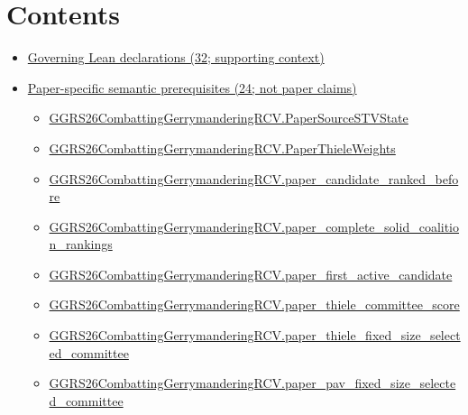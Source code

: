 \documentclass[10pt]{article}
\begin{document}
\section*{Contents}
\begin{itemize}[leftmargin=1.2em]
\item \hyperlink{governing-declaration-section-5ef5ef0364b6939c}{Governing Lean declarations (32; supporting context)}
\item \hyperlink{paper-prerequisite-section-5ef5ef0364b6939c}{Paper-specific semantic prerequisites (24; not paper claims)}
\begin{itemize}[leftmargin=1.2em]
\item \hyperlink{paper-prerequisite-9acd2440ce1052db}{GGRS26\allowbreak{}Combatting\allowbreak{}Gerrymandering\allowbreak{}RCV.\allowbreak{}Paper\allowbreak{}Source\allowbreak{}STV\allowbreak{}State}
\item \hyperlink{paper-prerequisite-37b91baa3b4ddc9d}{GGRS26\allowbreak{}Combatting\allowbreak{}Gerrymandering\allowbreak{}RCV.\allowbreak{}Paper\allowbreak{}Thiele\allowbreak{}Weights}
\item \hyperlink{paper-prerequisite-b12522706ad3f624}{GGRS26\allowbreak{}Combatting\allowbreak{}Gerrymandering\allowbreak{}RCV.\allowbreak{}paper\_\allowbreak{}candidate\_\allowbreak{}ranked\_\allowbreak{}before}
\item \hyperlink{paper-prerequisite-a48f905958044eb5}{GGRS26\allowbreak{}Combatting\allowbreak{}Gerrymandering\allowbreak{}RCV.\allowbreak{}paper\_\allowbreak{}complete\_\allowbreak{}solid\_\allowbreak{}coalition\_\allowbreak{}rankings}
\item \hyperlink{paper-prerequisite-e34992194a8b7f0d}{GGRS26\allowbreak{}Combatting\allowbreak{}Gerrymandering\allowbreak{}RCV.\allowbreak{}paper\_\allowbreak{}first\_\allowbreak{}active\_\allowbreak{}candidate}
\item \hyperlink{paper-prerequisite-7086a653b0f05ea7}{GGRS26\allowbreak{}Combatting\allowbreak{}Gerrymandering\allowbreak{}RCV.\allowbreak{}paper\_\allowbreak{}thiele\_\allowbreak{}committee\_\allowbreak{}score}
\item \hyperlink{paper-prerequisite-517db5abc400efba}{GGRS26\allowbreak{}Combatting\allowbreak{}Gerrymandering\allowbreak{}RCV.\allowbreak{}paper\_\allowbreak{}thiele\_\allowbreak{}fixed\_\allowbreak{}size\_\allowbreak{}selected\_\allowbreak{}committee}
\item \hyperlink{paper-prerequisite-82e254229a66cc0e}{GGRS26\allowbreak{}Combatting\allowbreak{}Gerrymandering\allowbreak{}RCV.\allowbreak{}paper\_\allowbreak{}pav\_\allowbreak{}fixed\_\allowbreak{}size\_\allowbreak{}selected\_\allowbreak{}committee}

\end{itemize}
\end{itemize}
\end{document}
